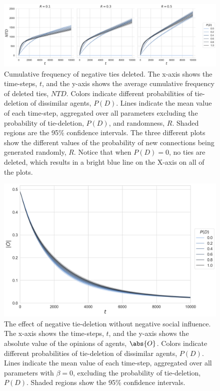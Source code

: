 \documentclass[11pt]{article}
\DeclarePairedDelimiter{\abs}\lvert\rvert
\begin{document}
\begin{figure}[H]
    \centering
    \includegraphics[width=.99\linewidth]{../plots/overall/Negative_Tie_Deleted.png}
  \caption{Cumulative frequency of negative ties deleted. The x-axis shows the time-steps, $t$, and the y-axis shows the average cumulative frequency of deleted ties, $NTD$. Colors indicate different probabilities of tie-deletion of dissimilar agents, $P(D)$. Lines indicate the mean value of each time-step, aggregated over all parameters excluding the probability of tie-deletion, $P(D)$, and randomness, $R$. Shaded regions are the 95\% confidence intervals. The three different plots show the different values of the probability of new connections being generated randomly, $R$. Notice that when $P(D) = 0$, no ties are deleted, which results in a bright blue line on the X-axis on all of the plots.}
  \label{fig:ntd}
\end{figure}

\begin{figure}[H]
    \centering
    \includegraphics[width=.99\linewidth]{../plots/overall/Absolute_Opinion_Tie_Deletion_Without_Negative.png}
  \caption{The effect of negative tie-deletion without negative social influence. The x-axis shows the time-steps, $t$, and the y-axis shows the absolute value of the opinions of agents, $\abs{O}$. Colors indicate different probabilities of tie-deletion of dissimilar agents, $P(D)$. Lines indicate the mean value of each time-step, aggregated over all parameters with $\beta = 0$, excluding the probability of tie-deletion, $P(D)$. Shaded regions show the 95\% confidence intervals.}
  \label{fig:pd_no_negative}
\end{figure}
\end{document}
